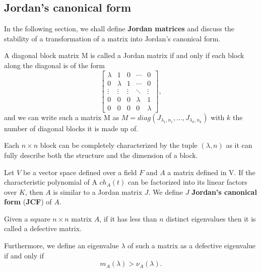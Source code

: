 \subsection*{Jordan's canonical form}
In the following section, we shall define \textbf{Jordan matrices} and discuss the stability of a transformation of a matrix
into Jordan's canonical form.
\begin{definition}
    A diagonal block matrix M is called a Jordan matrix if and only if each block along the diagonal is of the form
    \[
        \begin{bmatrix}
            \lambda     &    1         &    0     &   \cdots   &    0    \\
                0       &    \lambda   &    1     &   \cdots   &    0    \\
            \vdots      &    \vdots    &  \vdots  &   \ddots   & \vdots  \\
                0       &       0      &     0    &  \lambda   &    1    \\
                0       &       0      &     0    &     0      & \lambda
        \end{bmatrix},
    \]
    and we can write such a matrix M as
    \(M = diag(J_{\lambda_{1}, n_{1}}, ..., J_{\lambda_{k}, n_{k}})\) with \(k\) the number of diagonal blocks it is made up of.

    Each \(n \times n\) block can be completely characterized by the tuple \((\lambda, n)\) as it can fully describe both
    the structure and the dimension of a block.
\end{definition}

\begin{remark}
    Let \(V\) be a vector space defined over a field \(F\) and \(A\) a matrix defined in V. If the characteristic
    polynomial of A \(ch_{A}(t)\) can be factorized into its linear factors over \(K\), then \(A\) is similar to a
    Jordan matrix \(J\). We define \(J\) \textbf{Jordan's canonical form} (\textbf{JCF}) of \(A\).
\end{remark}

\begin{definition}
    Given a square \(n \times n\) matrix \(A\), if it has less than \(n\) distinct eigenvalues then it is called a
    defective matrix.

    Furthermore, we define an eigenvalue \(\lambda\) of such a matrix as a defective eigenvalue if and only if
    \[
        m_{A}(\lambda) > \nu_{A}(\lambda).
    \]
\end{definition}

